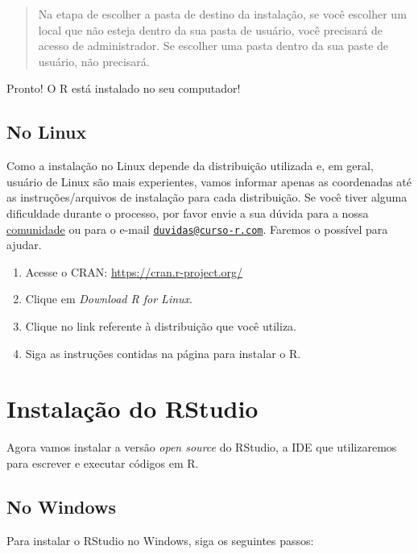 \documentclass[]{book}
\begin{document}
\begin{quote}
Na etapa de escolher a pasta de destino da instalação, se você escolher um local que não esteja dentro da sua pasta de usuário, você precisará de acesso de administrador. Se escolher uma pasta dentro da sua paste de usuário, não precisará.
\end{quote}

Pronto! O R está instalado no seu computador!

\hypertarget{no-linux}{%
\subsection{No Linux}\label{no-linux}}

Como a instalação no Linux depende da distribuição utilizada e, em geral, usuário de Linux são mais experientes, vamos informar apenas as coordenadas até as instruções/arquivos de instalação para cada distribuição. Se você tiver alguma dificuldade durante o processo, por favor envie a sua dúvida para a nossa \href{https://discourse.curso-r.com/}{comunidade} ou para o e-mail \href{mailto:duvidas@curso-r.com}{\nolinkurl{duvidas@curso-r.com}}. Faremos o possível para ajudar.

\begin{enumerate}
\def\labelenumi{\arabic{enumi}.}
\item
  Acesse o CRAN: \url{https://cran.r-project.org/}
\item
  Clique em \emph{Download R for Linux}.
\item
  Clique no link referente à distribuição que você utiliza.
\item
  Siga as instruções contidas na página para instalar o R.
\end{enumerate}

\hypertarget{instalauxe7uxe3o-do-rstudio}{%
\section{Instalação do RStudio}\label{instalauxe7uxe3o-do-rstudio}}

Agora vamos instalar a versão \emph{open source} do RStudio, a IDE que utilizaremos para escrever e executar códigos em R.

\hypertarget{no-windows-1}{%
\subsection{No Windows}\label{no-windows-1}}

Para instalar o RStudio no Windows, siga os seguintes passos:
\end{document}
